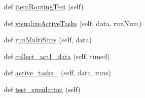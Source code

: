 \begin{DoxyCompactItemize}
\item 
def \mbox{\hyperlink{classdynamicfilterapp_1_1test__simulations_1_1_simulation_test_ad7a7fb027eb65a34c1de0ae0da78aa36}{item\+Routing\+Test}} (self)
\item 
def \mbox{\hyperlink{classdynamicfilterapp_1_1test__simulations_1_1_simulation_test_ae8ee81e4b8e7bc6bdd2ecb18e89b6c1e}{visualize\+Active\+Tasks}} (self, data, run\+Num)
\item 
def \mbox{\hyperlink{classdynamicfilterapp_1_1test__simulations_1_1_simulation_test_afa1a5372de5dde3c9948a073e6320e38}{run\+Multi\+Sims}} (self, data)
\item 
def \mbox{\hyperlink{classdynamicfilterapp_1_1test__simulations_1_1_simulation_test_a05f9a1130888c7fa3b2f0f19181d3ef0}{collect\+\_\+act1\+\_\+data}} (self, timed)
\item 
def \mbox{\hyperlink{classdynamicfilterapp_1_1test__simulations_1_1_simulation_test_a64f5ffabe9db5b9a4408bf765c7b26d6}{active\+\_\+tasks\+\_}} (self, data, runs)
\item 
def \mbox{\hyperlink{classdynamicfilterapp_1_1test__simulations_1_1_simulation_test_a0b4d16a4fb8b04ef001437aac75c25cf}{test\+\_\+simulation}} (self)
\end{DoxyCompactItemize}
